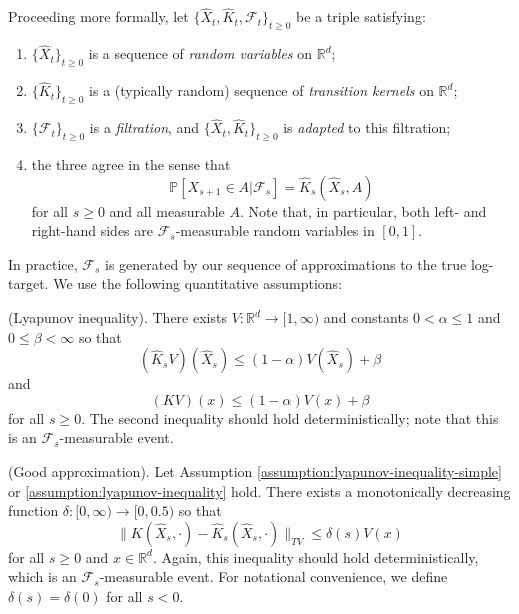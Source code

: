 Proceeding more formally, let $\{\hat{X}_t, \hat{K}_t, \mathcal{F}_t\}_{t \geq 0}$ be a triple satisfying:
\begin{enumerate}
    \item $\{\hat{X}_t\}_{t \geq 0}$ is a sequence of \textit{random variables} on $\mathbb{R}^{d}$;
    \item $\{\hat{K}_t\}_{t \geq 0}$ is a (typically random) sequence of \textit{transition kernels} on $\mathbb{R}^{d}$;
    \item $\{\mathcal{F}_t\}_{t \geq 0}$ is a \textit{filtration}, and $\{\hat{X}_t, \hat{K}_t\}_{t \geq 0}$ is \textit{adapted} to this filtration;
    \item the three agree in the sense that 
    \begin{equation} 
        \mathbb{P}[X_{s+1} \in A \vert \mathcal{F}_{s}] = \hat{K}_s(\hat{X}_s, A)
    \end{equation}
    for all $s \geq 0$ and all measurable $A$. Note that, in particular, both left- and right-hand sides are $\mathcal{F}_s$-measurable random variables in $[0, 1]$.
\end{enumerate}
In practice, $\mathcal{F}_{s}$ is generated by our sequence of approximations to the true log-target. We use the following quantitative assumptions:
\begin{assumption}
(Lyapunov inequality). There exists $V: \mathbb{R}^{d} \to [1, \infty)$ and constants $0 < \alpha \leq 1$ and $0 \leq \beta < \infty$ so that 
\begin{equation}
    (\hat{K}_s V)(\hat{X}_{s}) \leq (1-\alpha) V(\hat{X}_{s}) + \beta
\end{equation} 
and
\begin{equation}
    (KV)(x) \leq (1-\alpha) V(x) + \beta
\end{equation} 
for all $s \geq 0$. The second inequality should hold deterministically; note that this is an $\mathcal{F}_{s}$-measurable event.
\label{assumption:lyapunov-inequality}
\end{assumption}
\begin{assumption}
(Good approximation). Let Assumption \ref{assumption:lyapunov-inequality-simple} or \ref{assumption:lyapunov-inequality}  hold. There exists a monotonically decreasing function $\delta:[0, \infty) \to [0, 0.5)$ so that 
\begin{equation}
    \|K(\hat{X}_{s}, \cdot) - \hat{K}_s(\hat{X}_{s}, \cdot)\|_{TV} \leq \delta(s) V(x)
\end{equation}
for all $s \geq 0$ and $x \in \mathbb{R}^{d}$. Again, this inequality should hold deterministically, which is an $\mathcal{F}_{s}$-measurable event. For notational convenience, we define $\delta(s) = \delta(0)$ for all $s < 0$.
\label{assumption:good-approximation}
\end{assumption}

